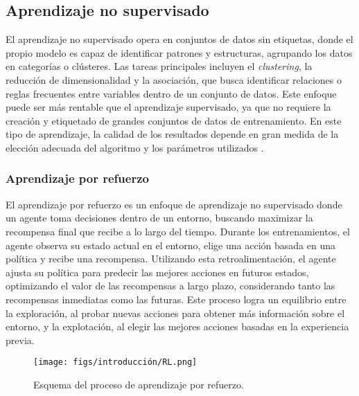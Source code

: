 \subsection{Aprendizaje no supervisado}

El aprendizaje no supervisado opera en conjuntos de datos sin etiquetas, donde el propio modelo es capaz de identificar patrones y estructuras, agrupando los datos en categorías o clústeres. Las tareas principales incluyen el \textit{clustering}, la reducción de dimensionalidad y la asociación, que busca identificar relaciones o reglas frecuentes entre variables dentro de un conjunto de datos. Este enfoque puede ser más rentable que el aprendizaje supervisado, ya que no requiere la creación y etiquetado de grandes conjuntos de datos de entrenamiento. En este tipo de aprendizaje, la calidad de los resultados depende en gran medida de la elección adecuada del algoritmo y los parámetros utilizados \cite{no-supervised-learning}.

\subsubsection{Aprendizaje por refuerzo}

El aprendizaje por refuerzo es un enfoque de aprendizaje no supervisado donde un agente toma decisiones dentro de un entorno, buscando maximizar la recompensa final que recibe a lo largo del tiempo. Durante los entrenamientos, el agente observa su estado actual en el entorno, elige una acción basada en una política y recibe una recompensa. Utilizando esta retroalimentación, el agente ajusta su política para predecir las mejores acciones en futuros estados, optimizando el valor de las recompensas a largo plazo, considerando tanto las recompensas inmediatas como las futuras. Este proceso logra un equilibrio entre la exploración, al probar nuevas acciones para obtener más información sobre el entorno, y la explotación, al elegir las mejores acciones basadas en la experiencia previa.

\begin{figure}[ht]
  \begin{center}
    \texttt{[image: figs/introducción/RL.png]}
  \end{center}
  \caption{Esquema del proceso de aprendizaje por refuerzo.}
  \label{rl}
\end{figure}

